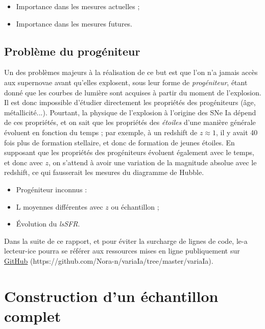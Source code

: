 \documentclass[a4paper, 12pt, svgnames]{article}
\begin{document}
\begin{itemize}
    \item Importance dans les mesures actuelles ;
    \item Importance dans les mesures futures.
\end{itemize}

\subsection{Problème du progéniteur}\label{ssec:prog}
Un des problèmes majeurs à la réalisation de ce but est que l'on n'a jamais
accès aux supernovae avant qu'elles explosent, sous leur forme de
\textit{progéniteur}, étant donné que les courbes de lumière sont acquises à
partir du moment de l'explosion. Il est donc impossible d'étudier directement
les propriétés des progéniteurs (âge, métallicité...). Pourtant, la physique de
l'explosion à l'origine des SNe Ia dépend de ces propriétés, et on sait que les
propriétés des \textit{étoiles} d'une manière générale évoluent en fonction du
temps ; par exemple, à un redshift de $z \approx 1$, il y avait 40 fois plus de
formation stellaire, et donc de formation de jeunes étoiles. En supposant que
les propriétés des progéniteurs évoluent également avec le temps, et donc avec
$z$, on s'attend à avoir une variation de la magnitude absolue avec le redshift,
ce qui fausserait les mesures du diagramme de Hubble.

\begin{itemize}
    \item Progéniteur inconnus :
    \item L moyennes différentes avec $z$ ou échantillon ;
    \item Évolution du \textit{lsSFR}.
\end{itemize}

Dans la suite de ce rapport, et pour éviter la surcharge de lignes de code, le-a
lecteur-ice pourra se référer aux ressources mises en ligne publiquement sur
\href{https://github.com/Nora-n/variaIa/tree/master/variaIa}{GitHub}
(https://github.com/Nora-n/variaIa/tree/master/variaIa).

\section{Construction d'un échantillon complet}\label{sec:complet}
\end{document}
